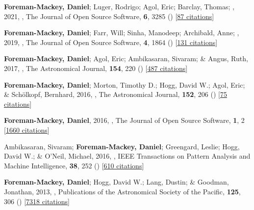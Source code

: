 \item[{\color{numcolor}\scriptsize7}] \textbf{Foreman-Mackey, Daniel}; Luger, Rodrigo; Agol, Eric; Barclay, Thomas; \etal, 2021, , The Journal of Open Source Software, \textbf{6}, 3285 () [\href{https://ui.adsabs.harvard.edu/abs/2021JOSS....6.3285F}{87 citations}]

\item[{\color{numcolor}\scriptsize6}] \textbf{Foreman-Mackey, Daniel}; Farr, Will; Sinha, Manodeep; Archibald, Anne; \etal, 2019, , The Journal of Open Source Software, \textbf{4}, 1864 () [\href{https://ui.adsabs.harvard.edu/abs/2019JOSS....4.1864F}{131 citations}]

\item[{\color{numcolor}\scriptsize5}] \textbf{Foreman-Mackey, Daniel}; Agol, Eric; Ambikasaran, Sivaram; \& Angus, Ruth, 2017, , The Astronomical Journal, \textbf{154}, 220 () [\href{https://ui.adsabs.harvard.edu/abs/2017AJ....154..220F}{487 citations}]

\item[{\color{numcolor}\scriptsize4}] \textbf{Foreman-Mackey, Daniel}; Morton, Timothy D.; Hogg, David W.; Agol, Eric; \& Sch{\"o}lkopf, Bernhard, 2016, , The Astronomical Journal, \textbf{152}, 206 () [\href{https://ui.adsabs.harvard.edu/abs/2016AJ....152..206F}{75 citations}]

\item[{\color{numcolor}\scriptsize3}] \textbf{Foreman-Mackey, Daniel}, 2016, , The Journal of Open Source Software, \textbf{1}, 2 [\href{https://scholar.google.com/scholar?cites=1835087844145558435,17325274697099535179,14220488595059618709,12820425635803494730,7284810048757141243,17415935839493019063}{1660 citations}]

\item[{\color{numcolor}\scriptsize2}] Ambikasaran, Sivaram; \textbf{Foreman-Mackey, Daniel}; Greengard, Leslie; Hogg, David W.; \& O'Neil, Michael, 2016, , IEEE Transactions on Pattern Analysis and Machine Intelligence, \textbf{38}, 252 () [\href{https://scholar.google.com/scholar?cites=7122560326210979193,5194420368165307096,3347404430934682534}{610 citations}]

\item[{\color{numcolor}\scriptsize1}] \textbf{Foreman-Mackey, Daniel}; Hogg, David W.; Lang, Dustin; \& Goodman, Jonathan, 2013, , Publications of the Astronomical Society of the Pacific, \textbf{125}, 306 () [\href{https://ui.adsabs.harvard.edu/abs/2013PASP..125..306F}{7318 citations}]